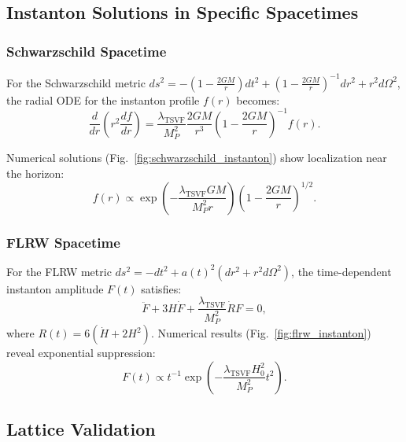 \documentclass[12pt, onecolumn]{article}
\theoremstyle{definition}
\numberwithin{equation}{section}
\begin{document}
\begin{appendices}
\subsection{Instanton Solutions in Specific Spacetimes}
\label{subsec:solutions}

\subsubsection{Schwarzschild Spacetime}
\label{subsubsec:schwarzschild}

For the Schwarzschild metric $ds^2 = -\left(1 - \frac{2GM}{r}\right)dt^2 + \left(1 - \frac{2GM}{r}\right)^{-1}dr^2 + r^2 d\Omega^2$, the radial ODE for the instanton profile $f(r)$ becomes:
\begin{equation}
    \frac{d}{dr}\left(r^2 \frac{df}{dr}\right) = \frac{\lambda_{\text{TSVF}}}{M_P^2} \frac{2GM}{r^3} \left(1 - \frac{2GM}{r}\right)^{-1} f(r). \label{eq:schwarzschild_ode}
\end{equation}

Numerical solutions (Fig.~\ref{fig:schwarzschild_instanton}) show localization near the horizon:
\begin{equation}
    f(r) \propto \exp\left(-\frac{\lambda_{\text{TSVF}} GM}{M_P^2 r}\right) \left(1 - \frac{2GM}{r}\right)^{1/2}. \label{eq:schwarzschild_sol}
\end{equation}

\subsubsection{FLRW Spacetime}
\label{subsubsec:flrw}

For the FLRW metric $ds^2 = -dt^2 + a(t)^2 \left(dr^2 + r^2 d\Omega^2\right)$, the time-dependent instanton amplitude $F(t)$ satisfies:
\begin{equation}
    \ddot{F} + 3H \dot{F} + \frac{\lambda_{\text{TSVF}}}{M_P^2} \dot{R} F = 0, \label{eq:flrw_ode}
\end{equation}
where $R(t) = 6(\dot{H} + 2H^2)$. Numerical results (Fig.~\ref{fig:flrw_instanton}) reveal exponential suppression:
\begin{equation}
    F(t) \propto t^{-1} \exp\left(-\frac{\lambda_{\text{TSVF}} H_0^2}{M_P^2} t^2\right). \label{eq:flrw_sol}
\end{equation}

\subsection{Lattice Validation}
\label{subsec:lattice}


\end{appendices}
\end{document}
